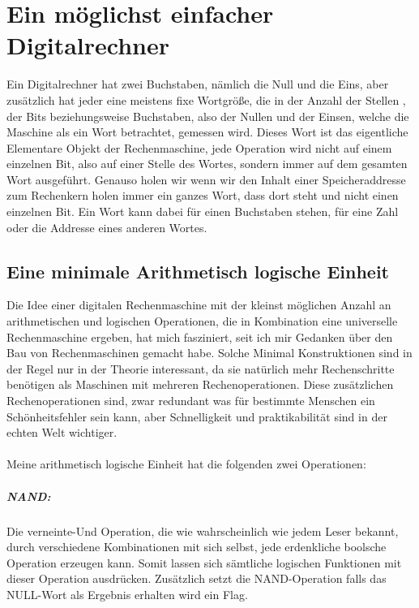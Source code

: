 \documentclass[11pt,a4paper,leqno]{report}
\numberwithin{equation}{chapter}
\begin{document}
\chapter{Ein möglichst einfacher Digitalrechner}
Ein Digitalrechner hat zwei Buchstaben, nämlich die Null und die Eins, aber zusätzlich hat jeder eine meistens fixe Wortgröße, die in der Anzahl der Stellen , der Bits beziehungsweise Buchstaben, also der Nullen und der Einsen, welche die Maschine als ein Wort betrachtet, gemessen wird. Dieses Wort ist das eigentliche Elementare Objekt der Rechenmaschine, jede Operation wird nicht auf einem einzelnen Bit, also auf einer Stelle des Wortes, sondern immer auf dem gesamten Wort ausgeführt. Genauso holen wir wenn wir den Inhalt einer Speicheraddresse zum Rechenkern holen immer ein ganzes Wort, dass dort steht und nicht einen einzelnen Bit.
Ein Wort kann dabei für einen Buchstaben stehen, für eine Zahl oder die Addresse eines anderen Wortes. 
\section{Eine minimale Arithmetisch logische Einheit}
Die Idee einer digitalen Rechenmaschine mit der kleinst möglichen Anzahl an arithmetischen und logischen Operationen, die in Kombination eine universelle Rechenmaschine ergeben, hat mich fasziniert, seit ich mir Gedanken über den Bau von Rechenmaschinen gemacht habe. Solche Minimal Konstruktionen sind in der Regel nur
in der Theorie interessant, da sie natürlich mehr Rechenschritte benötigen als Maschinen mit mehreren Rechenoperationen. Diese zusätzlichen Rechenoperationen sind, zwar redundant was für bestimmte Menschen ein Schönheitsfehler sein kann, aber Schnelligkeit und praktikabilität sind in der echten Welt wichtiger.\\
\\
Meine arithmetisch logische Einheit hat die folgenden zwei Operationen:
\paragraph{NAND: } Die verneinte-Und Operation, die wie wahrscheinlich wie jedem Leser bekannt, durch verschiedene Kombinationen mit sich selbst, jede erdenkliche boolsche Operation erzeugen kann. Somit lassen sich sämtliche logischen Funktionen mit dieser Operation ausdrücken. Zusätzlich setzt die NAND-Operation falls das NULL-Wort als Ergebnis erhalten wird ein Flag.
\end{document}
